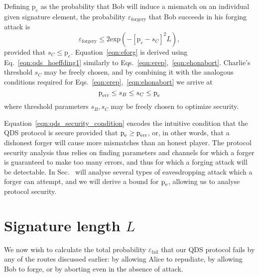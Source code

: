 Defining $\text{p}_e$ as the probability that Bob will induce a mismatch on an individual given signature element, the probability $\varepsilon_{\text{forgery}}$ that Bob succeeds in his forging attack is
\begin{equation}\label{eqn:eforg}
\varepsilon_{\text{forgery}} \le 2 \text{exp}\left( - \left[\text{p}_e - s_C\right]^2 L\right), 
\end{equation}
provided that $s_C \le \text{p}_e$. Equation~\ref{eqn:eforg} is derived using Eq.~\ref{eqn:qds_hoeffding1} similarly to Eqs.~\ref{eqn:erep},~\ref{eqn:ehonabort}. Charlie's threshold $s_C$ may be freely chosen, and by combining it with the analogous conditions required for Eqs.~\ref{eqn:erep},~\ref{eqn:ehonabort} we arrive at
\begin{equation}\label{eqn:qds_security_condition}
\text{p}_{\text{err}} \le s_B \le s_C \le \text{p}_{\text{e}} 
\end{equation}
where threshold parameters $s_B, s_C$ may be freely chosen to optimize security. 

Equation~\ref{eqn:qds_security_condition} encodes the intuitive condition that the QDS protocol is secure provided that $\text{p}_{\text{e}} \ge \text{p}_{\text{err}}$, or, in other words, that a dishonest forger will cause more mismatches than an honest player. The protocol security analysis thus relies on finding parameters and channels for which a forger is guaranteed to make too many errors, and thus for which a forging attack will be detectable. In Sec.~ will analyse several types of eavesdropping attack which a forger can attempt, and we will derive a bound for $\text{p}_{\text{e}}$, allowing us to analyse protocol security.


\section{Signature length $L$}

We now wish to calculate the total probability $\varepsilon_{\text{fail}}$ that our QDS protocol fails by any of the routes discussed earlier: by allowing Alice to repudiate, by allowing Bob to forge, or by aborting even in the absence of attack.


